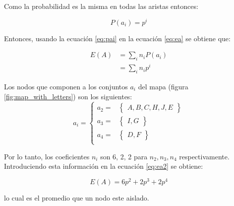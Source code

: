 Como la probabilidad es la misma en todas las aristas entonces:

\begin{equation}
    P(a_i) = p^i
    \label{eq:pai}
\end{equation}

Entonces, usando la ecuación \ref{eq:pai} en la ecuación \ref{eq:ea} se obtiene que:

\begin{align}
    E(A) & = \sum_i n_i P(a_i) \nonumber                \\
         & =  \sum_i n_i p^i             \label{eq:ea2}
\end{align}

Los nodos que componen a los conjuntos $a_i$ del mapa (figura \ref{fig:map_with_letters}) son los siguientes:
\begin{equation*}
    a_i = \left\lbrace \begin{matrix}
        a_2 = & \left\lbrace
        \begin{matrix}
            A, B, C, H, J, E
        \end{matrix} \right\rbrace  \\
        a_3 = & \left\lbrace
        \begin{matrix}
            I,G
        \end{matrix} \right\rbrace  \\
        a_4 = & \left\lbrace
        \begin{matrix}
            D, F
        \end{matrix} \right\rbrace \\
    \end{matrix} \right.
\end{equation*}

Por lo tanto, los coeficientes $n_i$ son 6, 2, 2 para $n_2,n_3,n_4$ respectivamente. Introduciendo esta información en la ecuación \ref{eq:ea2} se obtiene:

\begin{equation}
    E(A)= 6p^2 + 2p^3 + 2p^4
\end{equation}

lo cual es el promedio que un nodo este aislado.